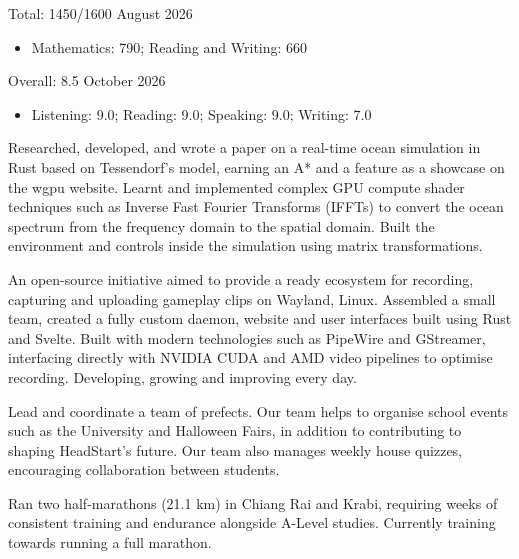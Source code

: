 \documentclass[10pt,a4paper,ragged2e, normalphoto]{altacv}
\begin{document}

{Total: 1450/1600}
{August 2026}{}{}{}
\begin{itemize}
	\item Mathematics: 790; Reading and Writing: 660
\end{itemize}

\divider

{Overall: 8.5}
{October 2026}{}{}{}
\begin{itemize}
	\item Listening: 9.0; Reading: 9.0;
	      Speaking: 9.0; Writing: 7.0
\end{itemize}

\newpage


Researched, developed, and wrote a paper on a real-time ocean simulation in Rust based on Tessendorf's model, earning an A* and a feature as a showcase on the wgpu website.
Learnt and implemented complex GPU compute shader techniques such as Inverse Fast Fourier Transforms (IFFTs) to convert the ocean spectrum from the frequency domain to the spatial domain.
Built the environment and controls inside the simulation using matrix transformations.

\divider

An open-source initiative aimed to provide a ready ecosystem for recording, capturing and uploading gameplay clips on Wayland, Linux.
Assembled a small team, created a fully custom daemon, website and user interfaces built using Rust and Svelte.
Built with modern technologies such as PipeWire and GStreamer, interfacing directly with NVIDIA CUDA and AMD video pipelines to optimise recording.
Developing, growing and improving every day.

\divider

Lead and coordinate a team of prefects.
Our team helps to organise school events such as the University and Halloween Fairs, in addition to contributing to shaping HeadStart's future.
Our team also manages weekly house quizzes, encouraging collaboration between students.


\divider

Ran two half-marathons (21.1 km) in Chiang Rai and Krabi, requiring weeks of consistent training and endurance alongside A-Level studies.
Currently training towards running a full marathon.
\end{document}

